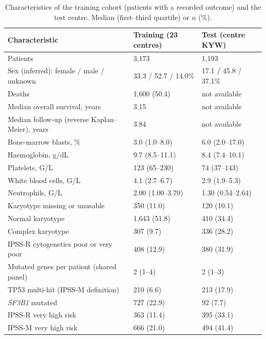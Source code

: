 \documentclass[11pt,a4paper]{article}
\begin{document}
\begin{table}[H]
\centering
\caption{Characteristics of the training cohort (patients with a recorded outcome) and
the test centre. Median (first--third quartile) or $n$ (\%).}
\label{tab:table1}
\small
\begin{tabular}{lll}
\toprule
Characteristic & Training (23 centres) & Test (centre KYW) \\
\midrule
Patients                                   & 3{,}173         & 1{,}193 \\
Sex (inferred): female / male / unknown    & 33.3 / 52.7 / 14.0\% & 17.1 / 45.8 / 37.1\% \\
Deaths                                     & 1{,}600 (50.4)  & not available \\
Median overall survival, years             & 3.15            & not available \\
Median follow-up (reverse Kaplan--Meier), years & 3.84       & not available \\
\midrule
Bone-marrow blasts, \%                     & 3.0 (1.0--8.0)   & 6.0 (2.0--17.0) \\
Haemoglobin, g/dL                          & 9.7 (8.5--11.1)  & 8.4 (7.4--10.1) \\
Platelets, G/L                             & 123 (65--230)    & 74 (37--143) \\
White blood cells, G/L                     & 4.1 (2.7--6.7)   & 2.9 (1.9--5.3) \\
Neutrophils, G/L                           & 2.00 (1.00--3.70) & 1.30 (0.54--2.64) \\
\midrule
Karyotype missing or unusable              & 350 (11.0)      & 120 (10.1) \\
Normal karyotype                           & 1{,}643 (51.8)  & 410 (34.4) \\
Complex karyotype                          & 307 (9.7)       & 336 (28.2) \\
IPSS-R cytogenetics poor or very poor      & 408 (12.9)      & 380 (31.9) \\
\midrule
Mutated genes per patient (shared panel)   & 2 (1--4)        & 2 (1--3) \\
TP53 multi-hit (IPSS-M definition)         & 210 (6.6)       & 213 (17.9) \\
\textit{SF3B1} mutated                     & 727 (22.9)      & 92 (7.7) \\
\midrule
IPSS-R very high risk                      & 363 (11.4)      & 395 (33.1) \\
IPSS-M very high risk                      & 666 (21.0)      & 494 (41.4) \\
\bottomrule
\end{tabular}
\end{table}
\end{document}
